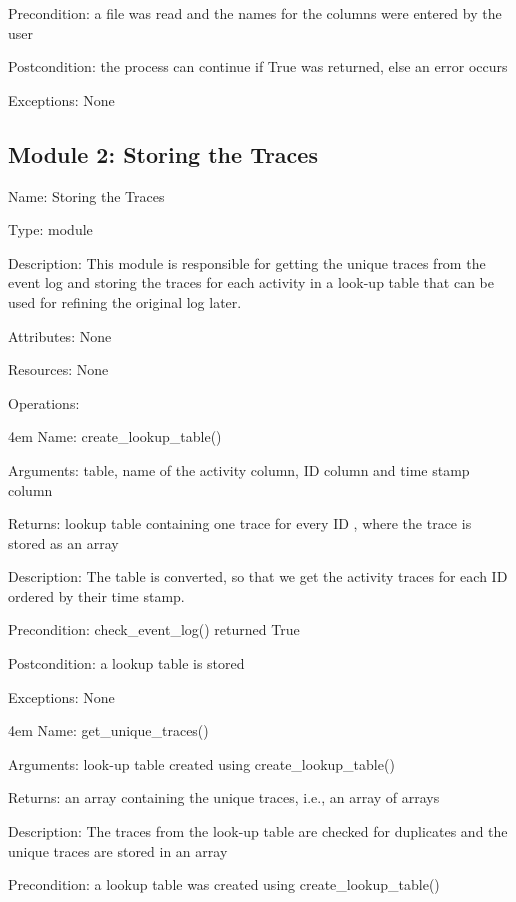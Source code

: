 \documentclass[notitlepage]{article}
\begin{document}
\begin{flushleft}
Precondition: a file was read and the names for the columns were entered by the user

Postcondition: the process can continue if True was returned, else an error occurs

Exceptions: None
\par
\endgroup


\subsection{Module 2: Storing the Traces}
Name: Storing the Traces

Type: module

Description: This module is responsible for getting the unique traces from the event log and storing the traces for each activity in a look-up table that can be used for refining the original log later. 

Attributes: None

Resources: None

Operations: 
\medskip

\par
\begingroup
\leftskip4em
Name: create\_lookup\_table()

Arguments: table,  name of the activity column, ID column and time stamp column

Returns: lookup table containing one trace for every ID , where the trace is stored as an array

Description: The table is converted, so that we get the activity traces for each ID ordered by their time stamp.

Precondition: check\_event\_log() returned True

Postcondition: a lookup table is stored

Exceptions: None

\par
\endgroup

\medskip

\par
\begingroup
\leftskip4em
Name: get\_unique\_traces()

Arguments: look-up table created using create\_lookup\_table()

Returns: an array containing the unique traces, i.e., an array of arrays

Description: The traces from the look-up table are checked for duplicates and the unique traces are stored in an array

Precondition: a lookup table was created using create\_lookup\_table()


\end{flushleft}
\end{document}
